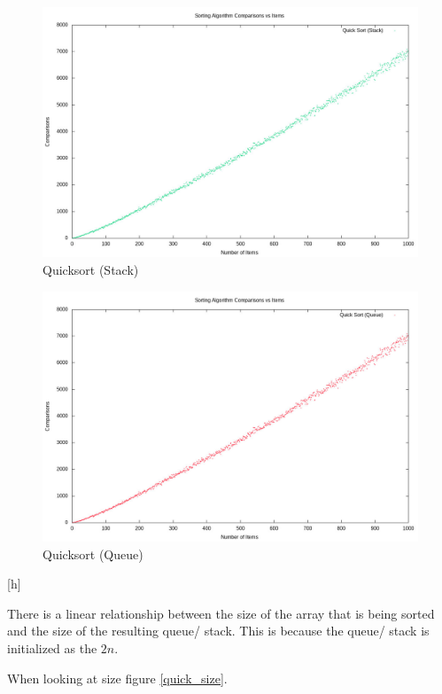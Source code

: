 \documentclass[12pt]{article}
\begin{document}
	\begin{figure}[H]
		\caption{Quicksort (Stack)}\label{stack}
		\includegraphics[width=\textwidth]{quick_stack}
		\centering
	\end{figure}

	\begin{figure}[H]
		\caption{Quicksort (Queue)}\label{queue}
		\includegraphics[width=\textwidth]{quick_queue}
		\centering
	\end{figure}[h]

	There is a linear relationship between the size of the array that is being sorted and the size of the resulting queue/ stack. This is because the queue/ stack is initialized as the $2n$.

	When looking at size figure \ref{quick_size}.
\end{document}
